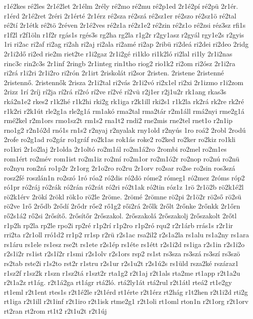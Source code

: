 {r1é2kes
ré2les
2r1é2let
2r1élm
2rély
ré2mo
ré2mu
ré2p1ed
2r1é2pí
ré2pü
2r1ér.
r1érd
2r1é2ret
2réri
2r1érté
2r1érz
ré2sza
ré2szá
ré2sz1er
ré2szo
ré2sz1ö
ré2tal
ré2tí
2r1étk
ré2tö
2réven
2r1é2ves
ré2z1a
ré2z1e2
ré2zin
ré2z1o
ré2zsi
réz3sz
rfi1s
r1f2l
r2f1öln
r1f2r
rgás1s
rgés3s
rg2ha
rg2la
r1g2r
r2gy1asz
r2gyál
rgy1e2s
r2gyis
1ri
ri2ac
ri2af
ri2ag
ri2ah
ri2aj
ri2ala
ri2amé
ri2ap
2ribü
ri2deá
ri2dei
ri2deo
2ridg
2r1i2dő
ri2ed
rie2m
riet2te
r1i2gaz
2r1i2gé
ri1klo
ri1k2ló
ri2lal
ri1ly
2r1i2nas
rinc3c
rin2c3s
2r1inf
2ringb
2r1integ
rin1tho
riog2
rio1k2
ri2om
ri2ósz
2r1i2ra
ri2rá
r1i2ri
2r1i2ro
ri2rón
2r1irt
2riskolát
ri2sor
2risten.
2ristene
2ristenné
2ristennő.
2ristennők
2risza
2r1i2tal
ri2vás
2r1i2vó
ri2x1el
ri2xi
2r1izmo
r1i2zom
2rizz
1rí
2ríj
rí2ja
rí2rá
rí2ró
rí2ve
rí2vé
rí2vü
r2j1er
r2j1u2r
rk1ang
rkas3s
rká2n1e2
rkes2
r1k2hé
r1k2hi
rki2g
rk1iga
r2k1ill
rki2s1
r1k2la
rk2rá
rk2re
rk2ré
r1k2ri
r2k1út
rle2g1a
rle2g1á
rm1akó
rma2tal
rma2tár
r2m1áll
rmá2nyi
rme2g1á
rmé2kel
r2m1ors
rmo1sz2t
rm1s2
rna1t2
rndi2
rne2mis
rne2tel
rnet1o
r2n1ip
rno1g2
r2n1ó2d
rnó1s
rn1s2
r2nyaj
r2nyalak
rny1old
r2nyús
1ro
roá2
2robl
2rodú
2rofe
ro2g1ad
ro2gár
ro1gráf
ro2k1as
rok1ás
roke2
ro2ked
ro2ker
ro2kiz
ro1kli
ro1kri
2r1o2laj
2r1olda
2r1oltó
ro2m1ál
ro2m1á2ro
2rombi
ro2mel
ro2m1es
rom1ért
ro2mév
rom1ist
ro2m1iz
ro2mí
ro2m1or
ro2m1ó2r
ro2nop
ro2nú
ro2nü
ro2nyu
ron2zá
ro1p2r
2r1org
2r1o2ro
ro2ru
2r1orv
ro2sar
ro2se
ro2sin
ros3szá
rosz2fé
roszlán1n
ro2szó
1ró
róa2
ró2dis
ró2dö
róme2
rómeg1
ró2mez
2róms
róp2
ró1pr
ró2ráj
ró2rák
ró2rán
ró2rát
ró2ri
ró2t1ak
ró2tin
róz1z
1rö
2r1ö2b
rö2k1é2l
rö2k1érv
2rökí
2rökl
rök1o
rö2le
2röme.
2römé
2römne
rö2pi
2r1ö2r
rö2ső
rö2sü
rö2ve
1rő
2rődb
2rődí
2rődr
rőe2
rő1g2
rői2rá
2rőlk
2rőlt
2rőnke
2rőnkk
2r1őrn
rő2s1á2
rő2si
2rősítő.
2rősítőr
2rőszakol.
2rőszakolá
2rőszakolj
2rőszakolt
2rőtl
r1p2h
rp2la
rp2le
rpo2i
rp2ré
r1p2rí
r1p2ro
r1p2ró
rqu2
r2r1árb
rrás1s
r2r1ir
rri2ta
r2r1oll
rró1d2
rr1p2
rr1sp
r2rü
r2s1ac
rsa2il2
r2s1a2la
rs1alu
rs1a2ny
rs1ara
rs1áru
rs1ele
rs1esz
rse2t
rs1ete
r2s1ép
rs1éte
rs1étt
r2s1i2d
rs1iga
r2s1in
r2s1i2o
r2s1i2r
rs1ist
r2s1í2r
r1smi
r2s1olv
r2s1ors
rsp2
rs1st
rs3sza
rs3szá
rs3szí
rs3szö
rs2tab
rste2i
r1s2to
rst2r
r1stru
r2s1ur
r2s1u2t
r2s1ú2s
rs1üld
rsza2ké
rszáraz1
r1sz2f
r1sz2k
r1szn
r1sz2tá
r1szt2r
rta1g2
r2t1aj
r2t1als
rta2me
rt1app
r2t1a2u
r2t1a2z
rt1ág.
r2t1á2ga
rt1ágr
rtá2ló.
rtá2ly1át
rtá2rul
r2t1átl
rteá2
rt1e2gy
rt1eml
r2t1ent
rtes1s
r2t1é2le
r2t1érd
rt1érte
r2t1érz
rt2hág
r1t2hen
r2t1i2d
rti2g
rt1iga
r2t1ill
r2t1inf
r2t1iro
r2t1isk
rtme2g1
r2t1oli
rt1oml
rton1n
r2t1org
r2t1orv
rt2ran
rt2rom
rt1t2
r2t1u2t
r2t1új
}
